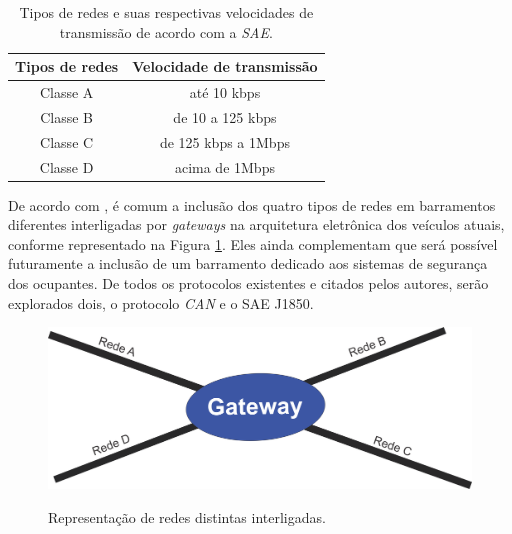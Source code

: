 \begin{table}[htb!]
\centering
\caption{Tipos de redes e suas respectivas velocidades de transmissão de acordo com a \textit{SAE}.}
\label{tab:tipos_redes_transmissao}
\begin{tabular}{cc}
\hline
Tipos de redes & \multicolumn{1}{c}{Velocidade de transmissão} \\ \hline
Classe A              & até 10 kbps                             \\
Classe B              & de 10 a 125 kbps                          \\
Classe C              & de 125 kbps a 1Mbps                       \\
Classe D              & acima de 1Mbps                            \\ \hline
\end{tabular}
\end{table}

De acordo com , é comum a inclusão dos quatro tipos de redes em barramentos diferentes interligadas por \textit{gateways} na arquitetura eletrônica dos veículos atuais, conforme representado na Figura \ref{Fig:redes_gateway}. Eles ainda complementam que será possível futuramente a inclusão de um barramento dedicado aos sistemas de segurança dos ocupantes. De todos os protocolos existentes e citados pelos autores, serão explorados dois, o protocolo \textit{CAN} e o SAE J1850.

\begin{figure}[!ht]
\centering
\caption{Representação de redes distintas interligadas.} 
{\includegraphics[scale=.35]{imagens/redesGateway.png}}\\
 \label{Fig:redes_gateway}
\end{figure}

